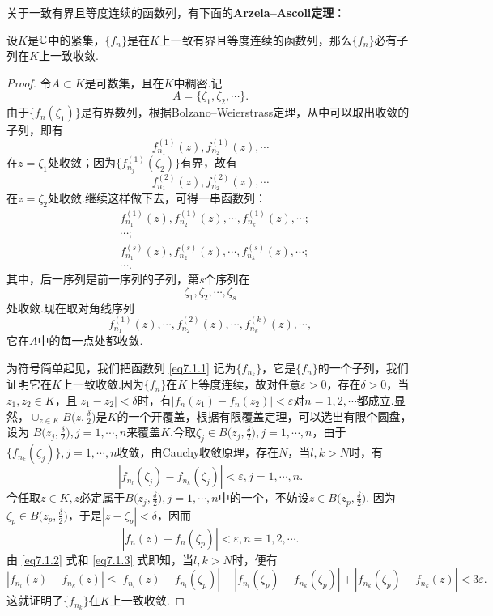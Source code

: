 关于一致有界且等度连续的函数列，有下面的\textbf{Arzela--Ascoli定理}：
\begin{theorem}\label{thm7.1.4}
设$K$是$\mathbb C$中的紧集，$\{f_n\}$是在$K$上一致有界且等度连续的函数列，那么$\{f_n\}$必有子列在$K$上一致收敛.
\end{theorem}
\begin{proof}
令$A\subset K$是可数集，且在$K$中稠密.记
\[A=\{\zeta_1,\zeta_2,\cdots\}.\]
由于$\{f_n(\zeta_1)\}$是有界数列，根据Bolzano--Weierstrass定理，从中可以取出收敛的子列，即有
\[f_{n_1}^{(1)}(z),f_{n_2}^{(1)}(z),\cdots\]
在$z=\zeta_1$处收敛；因为$\{f_{n_j}^{(1)}(\zeta_2)\}$有界，故有
\[f_{n_1}^{(2)}(z),f_{n_2}^{(2)}(z),\cdots\]
在$z=\zeta_2$处收敛.继续这样做下去，可得一串函数列：
\begin{align*}
&f_{n_1}^{(1)}(z),f_{n_2}^{(1)}(z),\cdots,f_{n_k}^{(1)}(z),\cdots;\\
&\cdots;\\
&f_{n_1}^{(s)}(z),f_{n_2}^{(s)}(z),\cdots,f_{n_k}^{(s)}(z),\cdots;\\
&\cdots.
\end{align*}
其中，后一序列是前一序列的子列，第$s$个序列在
\[\zeta_1,\zeta_2,\cdots,\zeta_s\]
处收敛.现在取对角线序列
\begin{equation}\label{eq7.1.1}
f_{n_1}^{(1)}(z),\cdots,f_{n_2}^{(2)}(z),\cdots,f_{n_k}^{(k)}(z),\cdots,
\end{equation}
它在$A$中的每一点处都收敛.

为符号简单起见，我们把函数列 \eqref{eq7.1.1} 记为$\{f_{n_k}\}$，它是$\{f_n\}$的一个子列，我们证明它在$K$上一致收敛.因为$\{f_n\}$在$K$上等度连续，故对任意$\varepsilon>0$，存在$\delta>0$，当$z_1,z_2\in K$，且$|z_1-z_2|<\delta$时，有$|f_n(z_1)-f_n(z_2)|<\varepsilon$对$n=1,2,\cdots$都成立.显然，$\operatorname*{\cup}_{z\in K}B\bigg(z,\frac\delta2\bigg)$是$K$的一个开覆盖，根据有限覆盖定理，可以选出有限个圆盘，设为
$B\bigg(z_j,\frac\delta2\bigg),j=1,\cdots,n$来覆盖$K$.今取$\zeta_j\in B\bigg(z_j,\frac\delta2\bigg),j=1,\cdots,n$，由于$\{f_{n_k}(\zeta_j)\},j=1,\cdots,n$收敛，由Cauchy收敛原理，存在$N$，当$l,k>N$时，有
\begin{equation}\label{eq7.1.2}
|f_{n_l}(\zeta_j)-f_{n_k}(\zeta_j)|<\varepsilon,j=1,\cdots,n.
\end{equation}
今任取$z\in K,z$必定属于$B\bigg(z_j,\frac\delta2\bigg),j=1,\cdots,n$中的一个，不妨设$z\in B\bigg(z_p,\frac\delta2\bigg)$. 因为$\zeta_p\in B\bigg(z_p,\frac\delta2\bigg)$，于是$|z-\zeta_p|<\delta$，因而
\begin{equation}\label{eq7.1.3}
|f_n(z)-f_n(\zeta_p)|<\varepsilon,n=1,2,\cdots.
\end{equation}
由 \eqref{eq7.1.2} 式和 \eqref{eq7.1.3} 式即知，当$l,k>N$时，便有
\begin{equation*}
|f_{n_l}(z)-f_{n_k}(z)|\le|f_{n_l}(z)-f_{n_l}(\zeta_p)|+
|f_{n_l}(\zeta_p)-f_{n_k}(\zeta_p)|+|f_{n_k}(\zeta_p)-f_{n_k}(z)|
<3\varepsilon.
\end{equation*}
这就证明了$\{f_{n_k}\}$在$K$上一致收敛.
\end{proof}

